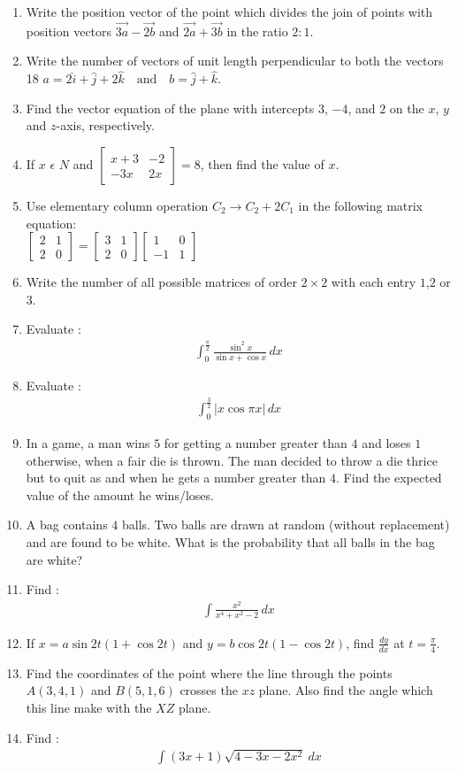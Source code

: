\documentclass[12pt,-letter paper]{article}
\providecommand{\myvec}[1]{\ensuremath{\begin{bmatrix}#1\end{bmatrix}}}
\begin{document}
\begin{enumerate}
\item Write the position vector of the point which divides the join of points with position vectors $ \overrightarrow{3a} -\overrightarrow{2b} $ and $ \overrightarrow{2a}+\overrightarrow{3b} $ in the ratio $ 2:1 $.
\item Write the number of vectors of unit length perpendicular to both the vectors
18 $a = 2\hat{i} + \hat{j} + 2\hat{k} \quad \text{and} \quad b = \hat{j} + \hat{k}$.
\item Find the vector equation of the plane with intercepts $3$, $- 4$, and $2$ on the $x$, $y$ and $z$-axis, respectively.
\item If $x$ $\epsilon$ $ N $ and $\myvec{x+3 & -2\\ -3x & 2x}=8$, then find the value of $x$.
\item Use elementary column operation $C_2 \rightarrow C_{2}+2C_{1}$ in the following  matrix  equation:\\ $\myvec{2 & 1 \\     2 & 0}=\myvec{3 & 1 \\ 2 & 0}\myvec{1 & 0 \\ -1 & 1}$
\item  Write the number of all possible matrices of order \(2\times 2\) with each entry $1$,$2$ or $3$.
\item Evaluate : 
\begin{align*} 
\int_{0}^{\frac{\pi}{2}} \frac{\sin^2 x}{\sin x + \cos x} \, dx
\end{align*}
\item Evaluate :
\begin{align*}
\int_{0}^\frac{3}{2}\left| x \cos \pi x \right| \, dx
\end{align*}
\item In a game, a man wins \rupee $ 5$  for getting a number greater than $4$ and loses \rupee $ 1$ otherwise, when a fair die is thrown. The man decided to throw a die thrice but to quit as and when he gets a number greater than $4$. Find the expected value of the amount he wins/loses.
\item  A bag contains $4$ balls. Two balls are drawn at random (without replacement) and are found to be white. What is the probability that all balls in the bag are white?
\item Find :                    
\begin{align*}                                    
\int \frac{x^2}{x^4 + x^2 - 2} \, dx   
\end{align*}
\item If $ x=a \sin 2t (1 + \cos 2t)$ and $ y=b \cos 2t (1 - \cos 2t)$, find $\frac{dy}{dx}$ at $ t = \frac{\pi}{4}$.
\item Find the coordinates of the point where the line through the points $ A(3,4,1) $ and $B(5,1,6)$ crosses the $xz$ plane. Also find the angle which this line make with the $XZ$ plane.
\item Find :
\begin{align*}  
\int (3x+1)\sqrt {4-3x-2x^2} \ dx    
\end{align*}


\end{enumerate}
\end{document}
